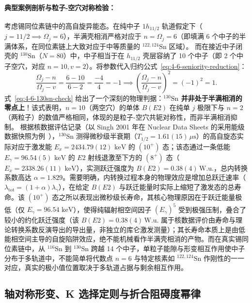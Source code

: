 \paragraph{典型案例剖析与粒子-空穴对称检验：}
考虑锡同位素链中的高自旋异能态。在纯中子 $1h_{11/2}$ 轨道假定下（$j=11/2 \implies \Omega_j = 6$），半满壳相消严格对应于 $n = \Omega_j = 6$（即填满 6 个中子的半满体系，在同位素链上大致对应于中等质量的 $^{122, 124}\mathrm{Sn}$ 区域）。
而在接近中子闭壳的 $^{130}\mathrm{Sn}$（$N=80$）中，中子相当于在 $h_{11/2}$ 壳层容纳了 10 个中子（即 2 个中子空穴，对应 $n=10, v=2$）。将参数代入归约公式~\eqref{eq:4-6-seniority-reduction}：
\begin{equation}\label{eq:4-6-130sn-check}
\frac{\Omega_j - n}{\Omega_j - v} = \frac{6 - 10}{6 - 2} = \frac{-4}{4} = -1 \implies \left( \frac{\Omega_j - n}{\Omega_j - v} \right)^2 = (-1)^2 = 1.
\end{equation}
式~\eqref{eq:4-6-130sn-check} 给出了一个深刻的物理判据：\textbf{$^{130}\mathrm{Sn}$ 并非处于半满相消的零点上}！该式表明，$n=10$（两空穴）的单体 $B(E2)$ 在纯单 $j$ 极限下与 $n=2$（两粒子）的数值严格相同，体现的是粒子-空穴共轭对称性，而非半满相消抑制。
根据核数据评估记录（以 Singh 2001 年在 Nuclear Data Sheets 的采用能级数据快照为例~\cite{singh-2001-nds-130sn-adopted}），$^{130}\mathrm{Sn}$ 测得微秒级半衰期（$T_{1/2} = 1.61(15)\,\mu\mathrm{s}$）的高自旋态实际对应于激发能 $E_x = 2434.79(12)\text{ keV}$ 的 $(10^+)$ 态；该态通过一条低能 $E_\gamma = 96.54(5)\text{ keV}$ 的 $E2$ 射线退激至下方的 $(8^+)$ 态（$E_x = 2338.26(11)\text{ keV}$），实测跃迁强度为 $B(E2) = 0.38(4)\,\text{W.u.}$，总内转换系数高达 $\alpha = 1.829$。需要明确，内转换过程本身的物理效应是增加总跃迁速率（$\lambda_{\mathrm{tot}} = (1+\alpha)\lambda_\gamma$），在给定 $B(E2)$ 与跃迁能量时实际上缩短了激发态的总寿命。该 $(10^+)$ 态之所以表现出微秒级长寿命，其核心物理原因在于跃迁能量极低（仅 $E_\gamma = 96.54\text{ keV}$），使得纯辐射相空间因子 $(E_\gamma)^5$ 受到极强压制，叠合了较小的约化跃迁强度（该 $B(E2) = 0.38(4)\,\text{W.u.}$ 属于核数据评价由寿命与理论转换系数反演导出的导出量，非独立的库仑激发测量）；其长寿命本质上是由低能相空间主导的自旋陷阱效应，绝不能机械看作半满壳相消的产物。而在真实锡同位素链中，从 $^{116}\mathrm{Sn}$ 到 $^{130}\mathrm{Sn}$ 跨越 14 个中子，单粒子能隙与形变相互作用使中子分布于多轨道中，不能简单将代数点 $n=6$ 与特定核素如 $^{122,124}\mathrm{Sn}$ 作刚性的一一对应，真实的极小值位置取决于多轨道占据与剩余相互作用。

\subsection{轴对称形变、K 选择定则与折合阻碍度幂律}\label{sec:4-6-2}

